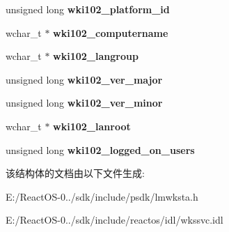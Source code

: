 \begin{DoxyCompactItemize}
unsigned long {\bfseries wki102\+\_\+platform\+\_\+id}
\item 
\mbox{\label{struct___w_k_s_t_a___i_n_f_o__102_a89a31b5ca251cbe894eebab8ebb587fb}} 
wchar\+\_\+t $\ast$ {\bfseries wki102\+\_\+computername}
\item 
\mbox{\label{struct___w_k_s_t_a___i_n_f_o__102_a44f249bf5b2b60fcb872d710f47f8356}} 
wchar\+\_\+t $\ast$ {\bfseries wki102\+\_\+langroup}
\item 
\mbox{\label{struct___w_k_s_t_a___i_n_f_o__102_ad4af61978666eec07455586f57f2b211}} 
unsigned long {\bfseries wki102\+\_\+ver\+\_\+major}
\item 
\mbox{\label{struct___w_k_s_t_a___i_n_f_o__102_afd4db870b6c6127d1ee3bd63a59b67a7}} 
unsigned long {\bfseries wki102\+\_\+ver\+\_\+minor}
\item 
\mbox{\label{struct___w_k_s_t_a___i_n_f_o__102_a513426fbff60f7a46421a77b3cacb695}} 
wchar\+\_\+t $\ast$ {\bfseries wki102\+\_\+lanroot}
\item 
\mbox{\label{struct___w_k_s_t_a___i_n_f_o__102_a82e72a5ecf121e752df64a66b0a42fd1}} 
unsigned long {\bfseries wki102\+\_\+logged\+\_\+on\+\_\+users}
\end{DoxyCompactItemize}


该结构体的文档由以下文件生成\+:\begin{DoxyCompactItemize}
\item 
E\+:/\+React\+O\+S-\/0../sdk/include/psdk/lmwksta.\+h\item 
E\+:/\+React\+O\+S-\/0../sdk/include/reactos/idl/wkssvc.\+idl\end{DoxyCompactItemize}
